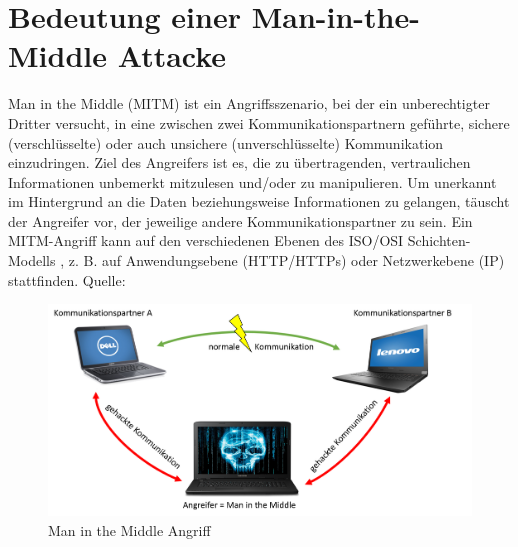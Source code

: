 \section{Bedeutung einer Man-in-the-Middle Attacke}
Man in the Middle (MITM) ist ein Angriffsszenario, bei der ein unberechtigter Dritter versucht, in eine zwischen zwei Kommunikationspartnern geführte, sichere (verschlüsselte) oder auch unsichere (unverschlüsselte) Kommunikation einzudringen. Ziel des Angreifers ist es, die zu übertragenden, vertraulichen Informationen unbemerkt mitzulesen und/oder zu manipulieren. Um unerkannt im Hintergrund an die Daten beziehungsweise Informationen zu gelangen, täuscht der Angreifer vor, der jeweilige andere Kommunikationspartner zu sein. Ein MITM-Angriff kann auf den verschiedenen Ebenen des ISO/OSI Schichten-Modells \cite[vgl.]{osi}, z. B. auf Anwendungsebene (HTTP/HTTPs) oder Netzwerkebene (IP) stattfinden. Quelle: \cite[vgl.]{mitm-def}
\begin{figure}[H]
	\centering
	\includegraphics[width=.8\linewidth]{images/MITM.png}
	\caption{Man in the Middle Angriff \cite{mitm-bild}}
\end{figure}